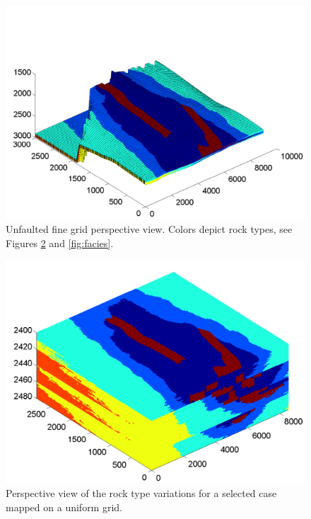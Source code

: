 \begin{figure}
\includegraphics[width=0.8\linewidth,natwidth=555bp,natheight=395bp]{./figurer/fineSat_Perspective_actual.pdf}
\caption{Unfaulted fine grid perspective view. Colors depict rock types, see Figures \ref{fig:finUnf} and \ref{fig:facies}.}
\label{fig:finAct}
\end{figure}

\begin{figure}
\includegraphics[width=0.8 \linewidth,natwidth=532bp,natheight=396bp]{./figurer/fineSat_Perspective_uniform.pdf}
\caption{Perspective view of the rock type variations for a selected case mapped on a uniform grid.}
\label{fig:finUnf}
\end{figure}

